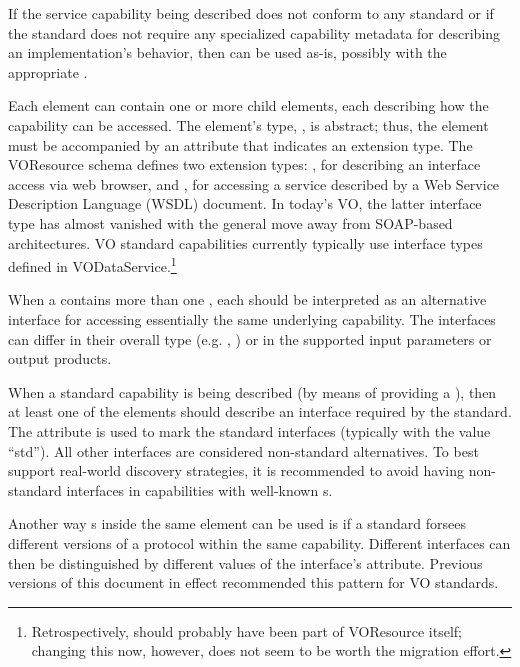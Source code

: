 \documentclass[11pt,a4paper]{ivoa}
\begin{document}
If the service capability being described does not conform to any
standard or if the standard does not require any specialized
capability metadata for describing an implementation's behavior, then
 can be used as-is, possibly with the appropriate
.


Each  element can contain one or more child
 elements, each describing how the capability
can be accessed.  The  element's type,
, is abstract; thus, the
 element must be accompanied by an
 attribute that indicates an
 extension type.  The VOResource schema
defines two  extension types:
, for describing an interface access via web
browser, and , for accessing a service
described by a Web Service Description Language (WSDL) document.  In
today's VO, the latter interface type has almost vanished with the
general move away from SOAP-based architectures.  VO standard
capabilities currently typically use interface types defined in
VODataService.\footnote{Retrospectively,  should probably
have been part of VOResource itself; changing this now, however, does
not seem to be worth the migration effort.}

When a  contains more than one
, each  should be
interpreted as an alternative interface for accessing essentially the
same underlying capability.  The interfaces can differ in their
overall type (e.g. ,
) or in the supported input parameters or
output products.  


When a standard capability is being described (by means of providing a
), then at least one of the
 elements should describe an interface required
by the standard.  The  attribute is used to mark the
standard interfaces (typically with the value ``std'').
All other interfaces are considered non-standard
alternatives.  To best support real-world discovery strategies, it is
recommended to avoid having non-standard interfaces in capabilities
with well-known s.

Another way s inside the same
 element can be used is if a standard forsees
different versions of a protocol within the same capability.  Different
interfaces can then be distinguished by different values of the
interface's  attribute.  Previous versions of this
document in effect recommended this pattern for VO standards.
\end{document}
